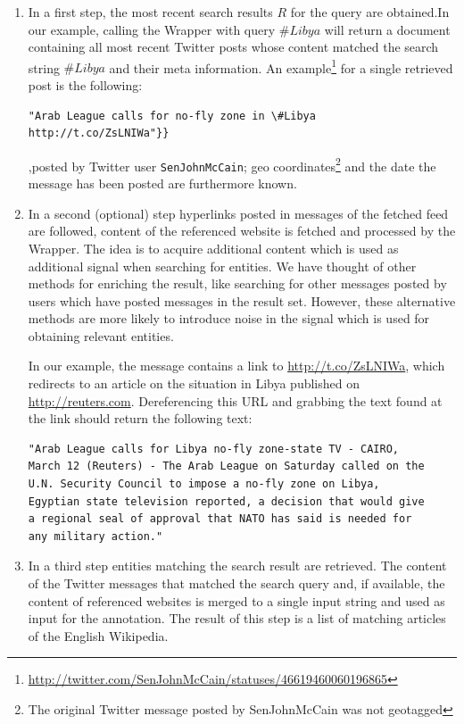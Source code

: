 \documentclass{llncs}
\begin{document}
\begin{enumerate}
	\item In a first step, the most recent search results $R$ for the query are
	obtained.\newline In our example, calling the Wrapper with query $\#Libya$ will
	return a document containing all most recent Twitter posts whose content
	matched the search string $\#Libya$ and their meta information. 
	\newline
	An example\footnote{\url{http://twitter.com/SenJohnMcCain/statuses/46619460060196865}}
for a single retrieved post is the following:
\begin{verbatim}
"Arab League calls for no-fly zone in \#Libya 
http://t.co/ZsLNIWa"}}
\end{verbatim}
,posted by Twitter user \texttt{SenJohnMcCain}; geo coordinates\footnote{The original Twitter message posted by SenJohnMcCain was not geotagged} and the date the message has been posted are furthermore known.
  
  \item In a second (optional) step hyperlinks posted in messages of the fetched
  feed are followed, content of the referenced website is fetched and processed by the Wrapper. The idea is to acquire additional content which is used as additional signal when searching for entities. We have thought of other methods for enriching the result, like searching for other messages posted by users which have posted messages in the result set. However, these alternative methods are more likely to introduce noise in the signal which is used for obtaining relevant entities.
  
In our example, the message contains a link to
\url{http://t.co/ZsLNIWa}, which redirects to an article on the situation in
Libya published on \url{http://reuters.com}. Dereferencing this URL and grabbing
the text found at the link should return the following text:
\begin{verbatim}
"Arab League calls for Libya no-fly zone-state TV - CAIRO, 
March 12 (Reuters) - The Arab League on Saturday called on the
U.N. Security Council to impose a no-fly zone on Libya, 
Egyptian state television reported, a decision that would give
a regional seal of approval that NATO has said is needed for 
any military action."
\end{verbatim}
	\item In a third step entities matching the search result are retrieved. The
	content of the Twitter messages that matched the search query and, if available, the content of referenced websites is merged to a single input string and used as input for the annotation. The result of this step is a list of matching articles of the English Wikipedia.


\end{enumerate}
\end{document}
